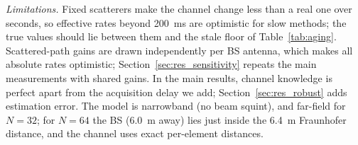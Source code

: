 \emph{Limitations.} Fixed scatterers make the channel change less than a real one over seconds, so effective rates beyond 200~ms are optimistic for slow methods; the true values should lie between them and the stale floor of Table~\ref{tab:aging}. Scattered-path gains are drawn independently per BS antenna, which makes all absolute rates optimistic; Section~\ref{sec:res_sensitivity} repeats the main measurements with shared gains. In the main results, channel knowledge is perfect apart from the acquisition delay we add; Section~\ref{sec:res_robust} adds estimation error. The model is narrowband (no beam squint), and far-field for $N=32$; for $N=64$ the BS (6.0~m away) lies just inside the 6.4~m Fraunhofer distance, and the channel uses exact per-element distances.
